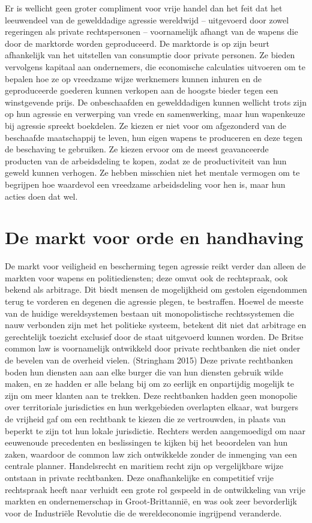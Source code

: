 \documentclass[
  a5paper,
  smalldemyvopaper,11pt,twoside,onecolumn,openright,extrafontsizes,
hidelinks]{memoir}
\begin{document}
Er is wellicht geen groter compliment voor vrije handel dan het feit dat
het leeuwendeel van de gewelddadige agressie wereldwijd -- uitgevoerd
door zowel regeringen als private rechtspersonen -- voornamelijk afhangt
van de wapens die door de marktorde worden geproduceerd. De marktorde is
op zijn beurt afhankelijk van het uitstellen van consumptie door private
personen. Ze bieden vervolgens kapitaal aan ondernemers, die economische
calculaties uitvoeren om te bepalen hoe ze op vreedzame wijze werknemers
kunnen inhuren en de geproduceerde goederen kunnen verkopen aan de
hoogste bieder tegen een winstgevende prijs. De onbeschaafden en
gewelddadigen kunnen wellicht trots zijn op hun agressie en verwerping
van vrede en samenwerking, maar hun wapenkeuze bij agressie spreekt
boekdelen. Ze kiezen er niet voor om afgezonderd van de beschaafde
maatschappij te leven, hun eigen wapens te produceren en deze tegen de
beschaving te gebruiken. Ze kiezen ervoor om de meest geavanceerde
producten van de arbeidsdeling te kopen, zodat ze de productiviteit van
hun geweld kunnen verhogen. Ze hebben misschien niet het mentale
vermogen om te begrijpen hoe waardevol een vreedzame arbeidsdeling voor
hen is, maar hun acties doen dat wel.

\section{De markt voor orde en
handhaving}\label{de-markt-voor-orde-en-handhaving}

De markt voor veiligheid en bescherming tegen agressie reikt verder dan
alleen de markten voor wapens en politiediensten; deze omvat ook de
rechtspraak, ook bekend als arbitrage. Dit biedt mensen de mogelijkheid
om gestolen eigendommen terug te vorderen en degenen die agressie
plegen, te bestraffen. Hoewel de meeste van de huidige wereldsystemen
bestaan uit monopolistische rechtssystemen die nauw verbonden zijn met
het politieke systeem, betekent dit niet dat arbitrage en gerechtelijk
toezicht exclusief door de staat uitgevoerd kunnen worden. De Britse
common law is voornamelijk ontwikkeld door private rechtbanken die niet
onder de bevelen van de overheid vielen. (Stringham 2015) Deze private
rechtbanken boden hun diensten aan aan elke burger die van hun diensten
gebruik wilde maken, en ze hadden er alle belang bij om zo eerlijk en
onpartijdig mogelijk te zijn om meer klanten aan te trekken. Deze
rechtbanken hadden geen monopolie over territoriale jurisdicties en hun
werkgebieden overlapten elkaar, wat burgers de vrijheid gaf om een
rechtbank te kiezen die ze vertrouwden, in plaats van beperkt te zijn
tot hun lokale jurisdictie. Rechters werden aangemoedigd om naar
eeuwenoude precedenten en beslissingen te kijken bij het beoordelen van
hun zaken, waardoor de common law zich ontwikkelde zonder de inmenging
van een centrale planner. Handelsrecht en maritiem recht zijn op
vergelijkbare wijze ontstaan in private rechtbanken. Deze onafhankelijke
en competitief vrije rechtspraak heeft naar verluidt een grote rol
gespeeld in de ontwikkeling van vrije markten en ondernemerschap in
Groot-Brittannië, en was ook zeer bevorderlijk voor de Industriële
Revolutie die de wereldeconomie ingrijpend veranderde.
\end{document}
